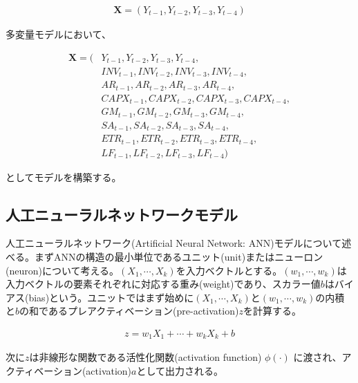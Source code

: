 \documentclass[a4paper, 12pt]{jsreport}
\begin{document}
\begin{equation}
  \begin{split}
    \bm{X} = (Y_{t-1}, Y_{t-2}, Y_{t-3}, Y_{t-4})
  \end{split}
\end{equation}

多変量モデルにおいて、

\begin{equation}
  \begin{split}
    \bm{X} = (
    & Y_{t-1}, Y_{t-2}, Y_{t-3}, Y_{t-4}, \\
    & INV_{t-1}, INV_{t-2}, INV_{t-3}, INV_{t-4}, \\
    & AR_{t-1}, AR_{t-2}, AR_{t-3}, AR_{t-4}, \\
    & CAPX_{t-1}, CAPX_{t-2}, CAPX_{t-3}, CAPX_{t-4}, \\
    & GM_{t-1}, GM_{t-2}, GM_{t-3}, GM_{t-4}, \\
    & SA_{t-1}, SA_{t-2}, SA_{t-3}, SA_{t-4}, \\
    & ETR_{t-1}, ETR_{t-2}, ETR_{t-3}, ETR_{t-4}, \\ 
    & LF_{t-1}, LF_{t-2}, LF_{t-3}, LF_{t-4}
    )
  \end{split}
\end{equation}

としてモデルを構築する。

\subsection{人工ニューラルネットワークモデル}

人工ニューラルネットワーク(Artificial Neural Network: ANN)モデルについて述べる。まずANNの構造の最小単位であるユニット(unit)またはニューロン(neuron)について考える。$(X_1, \cdots, X_k)$を入力ベクトルとする。$(w_1, \cdots, w_k)$は入力ベクトルの要素それぞれに対応する重み(weight)であり、スカラー値$b$はバイアス(bias)という。ユニットではまず始めに$(X_1, \cdots, X_k)$と$(w_1, \cdots, w_k)$の内積と$b$の和であるプレアクティベーション(pre-activation)$z$を計算する。

\begin{equation}
  \begin{split}
    z = w_1 X_1 + \cdots + w_k X_k + b
  \end{split}
\end{equation}

次に$z$は非線形な関数である活性化関数(activation function) $\phi(\cdot)$ に渡され、アクティベーション(activation)$a$として出力される。
\end{document}
